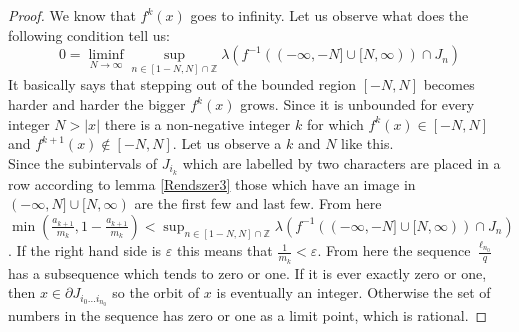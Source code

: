 \documentclass{article}
\newtheorem{theorem}{Theorem}[section]
\begin{document}
\begin{proof}
We know that $f^k(x)$ goes to infinity. Let us observe what does the following condition tell us:\[
0 = \liminf_{N\rightarrow \infty} \sup_{n\in [1-N,N]\cap \mathbb{Z}} \lambda (f^{-1}( (-\infty, -N] \cup [N, \infty)) \cap J_n)
\] 
It basically says that stepping out of the bounded region $[-N, N]$ becomes harder and harder the bigger $f^k(x)$ grows. Since it is unbounded for every integer $N > |x|$ there is a non-negative integer $k$ for which $f^k(x)\in [-N, N]$ and $f^{k+1}(x) \notin [-N,N]$. Let us observe a $k$ and $N$ like this.\\

Since the subintervals of  $J_{i_k}$ which are labelled by two characters are placed in a row according to lemma \ref{Rendszer3} those which have an image in $(-\infty, N] \cup [N,\infty)$ are the first few and last few. From here $\min(\frac{a_{k+1}}{m_{k}}, 1 - \frac{a_{k+1}}{m_{k}}) < \sup_{n\in [1-N,N]\cap \mathbb{Z}} \lambda (f^{-1}( (-\infty, -N] \cup [N, \infty)) \cap J_n)$. If the right hand side is $\varepsilon$ this means that $\frac{1}{m_k} < \varepsilon$. From here the sequence $\frac{\ell_{n_0}}{q}$ has a subsequence which tends to zero or one. If it is ever exactly zero or one, then $x \in \partial J_{i_0...i_{n_0}}$ so the orbit of $x$ is eventually an integer. Otherwise the set of numbers in the sequence has zero or one as a limit point, which is rational.
\end{proof}






\end{document}
